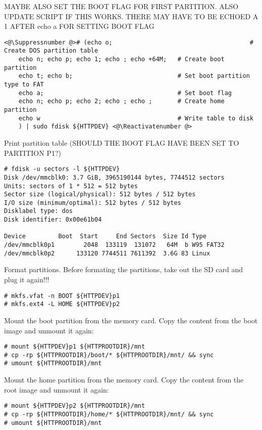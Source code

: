 MAYBE ALSO SET THE BOOT FLAG FOR FIRST PARTITION. ALSO UPDATE SCRIPT IF THIS
WORKS. THERE MAY HAVE TO BE ECHOED A 1 AFTER echo a FOR SETTING BOOT FLAG
\begin{lstlisting}[]
<@\Suppressnumber @># (echo o;                                      # Create DOS partition table
    echo n; echo p; echo 1; echo ; echo +64M;   # Create boot partition
    echo t; echo b;                             # Set boot partition type to FAT
    echo a;                                     # Set boot flag
    echo n; echo p; echo 2; echo ; echo ;       # Create home partition
    echo w                                      # Write table to disk
    ) | sudo fdisk ${HTTPDEV} <@\Reactivatenumber @>
\end{lstlisting}
\FloatBarrier
\vspace{-5mm}

Print partition table (SHOULD THE BOOT FLAG HAVE BEEN SET TO PARTITION P1?)
\begin{lstlisting}[]
# fdisk -u sectors -l ${HTTPDEV}
Disk /dev/mmcblk0: 3.7 GiB, 3965190144 bytes, 7744512 sectors
Units: sectors of 1 * 512 = 512 bytes
Sector size (logical/physical): 512 bytes / 512 bytes
I/O size (minimum/optimal): 512 bytes / 512 bytes
Disklabel type: dos
Disk identifier: 0x00e61b04

Device         Boot  Start     End Sectors  Size Id Type
/dev/mmcblk0p1        2048  133119  131072   64M  b W95 FAT32
/dev/mmcblk0p2      133120 7744511 7611392  3.6G 83 Linux
\end{lstlisting}
\FloatBarrier
\vspace{-5mm}

Format partitions. Before formating the partitions, take out the SD card
and plug it again!!!
\begin{lstlisting}[]
# mkfs.vfat -n BOOT ${HTTPDEV}p1
# mkfs.ext4 -L HOME ${HTTPDEV}p2
\end{lstlisting}
\FloatBarrier
\vspace{-5mm}

Mount the boot partition from the memory card. Copy the content from the
boot image and unmount it again:
\begin{lstlisting}[]
# mount ${HTTPDEV}p1 ${HTTPROOTDIR}/mnt
# cp -rp ${HTTPROOTDIR}/boot/* ${HTTPROOTDIR}/mnt/ && sync
# umount ${HTTPROOTDIR}/mnt
\end{lstlisting}
\FloatBarrier
\vspace{-5mm}

Mount the home partition from the memory card. Copy the content from the
root image and unmount it again:
\begin{lstlisting}[]
# mount ${HTTPDEV}p2 ${HTTPROOTDIR}/mnt
# cp -rp ${HTTPROOTDIR}/home/* ${HTTPROOTDIR}/mnt/ && sync
# umount ${HTTPROOTDIR}/mnt
\end{lstlisting}
\FloatBarrier
\vspace{-5mm}


